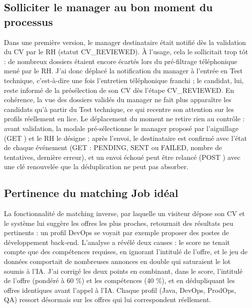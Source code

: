 \subsection{Solliciter le manager au bon moment du processus}
\label{sec_4_5_5}
Dans une première version, le manager destinataire était notifié dès la validation du CV par le RH (statut CV\_REVIEWED). À l’usage, cela le sollicitait trop tôt : de nombreux dossiers étaient encore écartés lors du pré-filtrage téléphonique mené par le RH. J’ai donc déplacé la notification du manager à l’entrée en Test technique, c’est-à-dire une fois l’entretien téléphonique franchi ; le candidat, lui, reste informé de la présélection de son CV dès l’étape CV\_REVIEWED. En cohérence, la vue des dossiers validés du manager ne fait plus apparaître les candidats qu’à partir du Test technique, ce qui recentre son attention sur les profils réellement en lice. Le déplacement du moment ne retire rien au contrôle : avant validation, la modale pré-sélectionne le manager proposé par l’aiguillage (GET ) et le RH le désigne ; après l’envoi, le destinataire est confirmé avec l’état de chaque événement (GET  : PENDING, SENT ou FAILED, nombre de tentatives, dernière erreur), et un envoi échoué peut être relancé (POST ) avec une clé renouvelée que la déduplication ne peut pas absorber.

\subsection{Pertinence du matching Job idéal}
\label{sec_4_5_6}
La fonctionnalité de matching inverse, par laquelle un visiteur dépose son CV et le système lui suggère les offres les plus proches, retournait des résultats peu pertinents : un profil DevOps se voyait par exemple proposer des postes de développement back-end. L’analyse a révélé deux causes : le score ne tenait compte que des compétences requises, en ignorant l’intitulé de l’offre, et le jeu de données comportait de nombreuses annonces en double qui saturaient le lot soumis à l’IA. J’ai corrigé les deux points en combinant, dans le score, l’intitulé de l’offre (pondéré à 60 \%) et les compétences (40 \%), et en dédupliquant les offres identiques avant l’appel à l’IA. Chaque profil (Java, DevOps, ProdOps, QA) ressort désormais sur les offres qui lui correspondent réellement.

